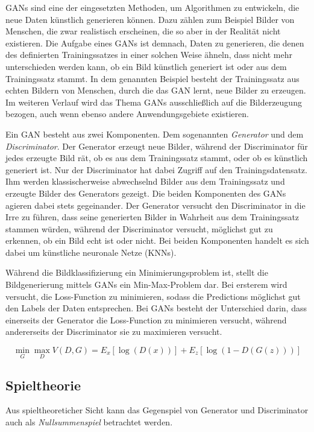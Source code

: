 \label{chap:GANs}
\acp{GAN} sind eine der eingesetzten Methoden, um Algorithmen zu entwickeln, die neue Daten künstlich generieren können. Dazu zählen zum Beispiel Bilder von Menschen, die zwar realistisch erscheinen, die so aber in der Realität nicht existieren. Die Aufgabe eines \acp{GAN} ist demnach, Daten zu generieren, die denen des definierten Trainingssatzes in einer solchen Weise ähneln, dass nicht mehr unterschieden werden kann, ob ein Bild künstlich generiert ist oder aus dem Trainingssatz stammt. In dem genannten Beispiel besteht der Trainingssatz aus echten Bildern von Menschen, durch die das \ac{GAN} lernt, neue Bilder zu erzeugen. Im weiteren Verlauf wird das Thema \acp{GAN} ausschließlich auf die Bilderzeugung bezogen, auch wenn ebenso andere Anwendungsgebiete existieren. \cite{visualApproach}

Ein \ac{GAN} besteht aus zwei Komponenten. Dem sogenannten \emph{Generator} und dem \emph{Discriminator}. Der Generator erzeugt neue Bilder, während der Discriminator für jedes erzeugte Bild rät, ob es aus dem Trainingssatz stammt, oder ob es künstlich generiert ist. Nur der Discriminator hat dabei Zugriff auf den Trainingsdatensatz. Ihm werden klassischerweise abwechselnd Bilder aus dem Trainingssatz und erzeugte Bilder des Generators gezeigt. Die beiden Komponenten des \acp{GAN} agieren dabei stets gegeinander. Der Generator versucht den Discriminator in die Irre zu führen, dass seine generierten Bilder in Wahrheit aus dem Trainingssatz stammen würden, während der Discriminator versucht, möglichst gut zu erkennen, ob ein Bild echt ist oder nicht. Bei beiden Komponenten handelt es sich dabei um künstliche neuronale Netze (\acp{KNN}). \cite{visualApproach}

Während die Bildklassifizierung ein Minimierungsproblem ist, stellt die Bildgenerierung mittels \acp{GAN} ein Min-Max-Problem dar. Bei ersterem wird versucht, die Loss-Function zu minimieren, sodass die Predictions möglichst gut den Labels der Daten entsprechen. Bei \acp{GAN} besteht der Unterschied darin, dass einerseits der Generator die Loss-Function zu minimieren versucht, während andererseits der Discriminator sie zu maximieren versucht.

\begin{equation}
	\min_{G} \max_{D} V(D,G) = E_x[\log(D(x))] + E_z[\log(1-D(G(z)))]
\end{equation}

\subsection{Spieltheorie}
Aus spieltheoreticher Sicht kann das Gegenspiel von Generator und Discriminator auch als \emph{Nullsummenspiel} betrachtet werden.

